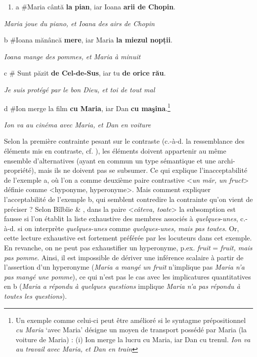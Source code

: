 \begin{enumerate}
\item \label{bkm:Ref289441864}a  \#Maria cântă \textbf{la pian}, iar Ioana \textbf{arii de Chopin}.


\end{enumerate}
{\itshape
Maria joue du piano, et Ioana des airs de Chopin}

  b  \#Ioana mănâncă \textbf{mere}, iar Maria \textbf{la miezul nopții}. 

    \textit{Ioana mange des pommes, et Maria à minuit}

  c  \# Sunt păzit \textbf{de Cel-de-Sus}, iar tu \textbf{de orice rău}. 

    \textit{Je suis protégé par le bon Dieu, et toi de tout mal}

  d  \#Ion merge la film \textbf{cu Maria}, iar Dan \textbf{cu maşina}.\footnote{Un exemple comme celui-ci peut être amélioré si le syntagme prépositionnel \textit{cu Maria} `avec Maria' désigne un moyen de transport possédé par Maria (la voiture de Maria) : 
(i)  Ion merge la lucru cu Maria, iar Dan cu trenul.
  \textit{Ion va au travail avec Maria, et Dan en train}} 

    \textit{Ion va au cinéma avec Maria, et Dan en voiture}

Selon la première contrainte pesant sur le contraste (c.-à-d. la ressemblance des éléments mis en contraste, cf. \citet{Umbach2005}), les éléments doivent appartenir au même ensemble d'alternatives (ayant en commun un type sémantique et une archi-propriété), mais ils ne doivent pas se subsumer. Ce qui explique l'inacceptabilité de l'exemple a, où l'on a comme deuxième paire contrastive {\textless}\textit{un măr, un fruct}{\textgreater} définie comme {\textless}hyponyme, hyperonyme{\textgreater}. Mais comment expliquer l'acceptabilité de l'exemple b, qui semblent contredire la contrainte qu'on vient de préciser ? Selon Bîlbîie \& \citet{Winterstein2011}, dans la paire {\textless}\textit{câteva, toate}{\textgreater} la subsomption est fausse si l'on établit la liste exhaustive des membres associés à \textit{quelques}-\textit{unes}, c.-à-d. si on interprète \textit{quelques-unes} comme \textit{quelques-unes, mais pas toutes}. Or, cette lecture exhaustive est fortement préférée par les locuteurs dans cet exemple. En revanche, on ne peut pas exhaustifier un hyperonyme, p.ex. \textit{fruit} = \textit{fruit, mais pas pomme}. Ainsi, il est impossible de dériver une inférence scalaire à partir de l'assertion d'un hyperonyme (\textit{Maria a mangé un fruit} n'implique pas \textit{Maria n'a pas mangé une pomme}), ce qui n'est pas le cas avec les implicatures quantitatives en b (\textit{Maria a répondu à quelques questions} implique \textit{Maria n'a pas répondu à toutes les questions}).


